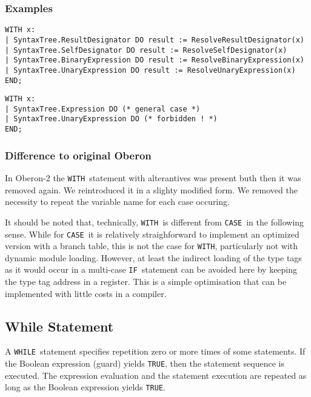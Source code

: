 \documentclass[a4wide,11pt]{article}
\newcommand{\IF}{\lstinline"IF"}
\newcommand{\CASE}{\lstinline"CASE"}
\newcommand{\WHILE}{\lstinline"WHILE"}
\newcommand{\WITH}{\lstinline"WITH"}
\newcommand{\TRUE}{\lstinline"TRUE"}
\begin{document}
\begin{annotation}
\subsubsection{Examples}
\begin{lstlisting}[style=example, caption=Example of a WITH statement]
WITH x:
| SyntaxTree.ResultDesignator DO result := ResolveResultDesignator(x)
| SyntaxTree.SelfDesignator DO result := ResolveSelfDesignator(x)
| SyntaxTree.BinaryExpression DO result := ResolveBinaryExpression(x)
| SyntaxTree.UnaryExpression DO result := ResolveUnaryExpression(x)
END;
\end{lstlisting}

\begin{lstlisting}[style=example, caption= Example of a rejected WITH statement when UnaryExpression inherits from Expression]
WITH x:
| SyntaxTree.Expression DO (* general case *)
| SyntaxTree.UnaryExpression DO (* forbidden ! *)
END;
\end{lstlisting}

\subsubsection{Difference to original Oberon}
In Oberon-2 the \WITH\ statement with alterantives was present buth then it was removed again.
We reintroduced it in a slighty modified form.
We removed the necessity to repeat the variable name for each case occuring.

It should be noted that, technically, \WITH\ is different from \CASE\ in the following sense.
While for \CASE\ it is relatively straighforward to implement an optimized version with a branch table, this is not the case for \WITH, particularly not with dynamic module loading.
However, at least the indirect loading of the type tags as it would occur in a multi-case \IF\ statement can be avoided here by keeping the type tag address in a register.
This is a simple optimisation that can be implemented with little costs in a compiler.
\end{annotation}

\subsection{While Statement}

A \WHILE\ statement specifies repetition zero or more times of some statements.
If the Boolean expression (guard) yields \TRUE, then the statement sequence is executed.
The expression evaluation and the statement execution are repeated as long as the Boolean expression yields \TRUE.
\end{document}
